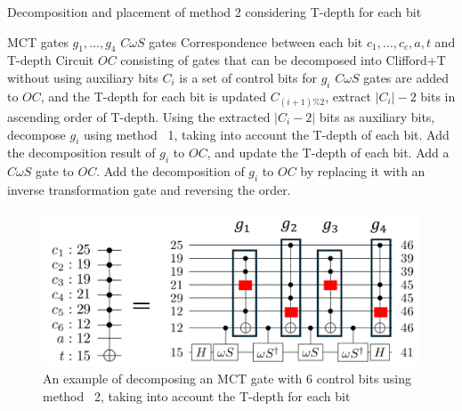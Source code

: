 \begin{algorithm}[tbp]
\caption{Decomposition and placement of method 2 considering T-depth for each bit}
\label{alg:method2_placement_decomp}
\begin{algorithmic}[1]
\Require MCT gates $g_{1},\dots, g_{4}$
\Require $C\omega S$ gates
\Require Correspondence between each bit $c_{1},\dots, c_{c}, a, t$ and T-depth
\Ensure Circuit $OC$ consisting of gates that can be decomposed into Clifford+T without using auxiliary bits
\State $C_{i}$ is a set of control bits for $g_{i}$
\State $C\omega S$ gates are added to $OC$, and the T-depth for each bit is updated
\State $C_{(i+1)\% 2}$, extract $|C_{i}|-2$ bits in ascending order of T-depth.
\State Using the extracted $|C_{i}-2|$ bits as auxiliary bits, decompose $g_{i}$ using method ~1, taking into account the T-depth of each bit.
\State Add the decomposition result of $g_{i}$ to $OC$, and update the T-depth of each bit.
\EndFor
{}
\State Add a $C\omega S$ gate to $OC$.
\State Add the decomposition of $g_{i}$ to $OC$ by replacing it with an inverse transformation gate and reversing the order.
\EndFor
\end{algorithmic}
\end{algorithm}
\par
\begin{figure}
\centering
\includegraphics[width=0.95\linewidth]{img/mimap_proposed.pdf}
\caption{An example of decomposing an MCT gate with 6 control bits using method ~2, taking into account the T-depth for each bit}
\label{mimap_proposed}
\end{figure}
